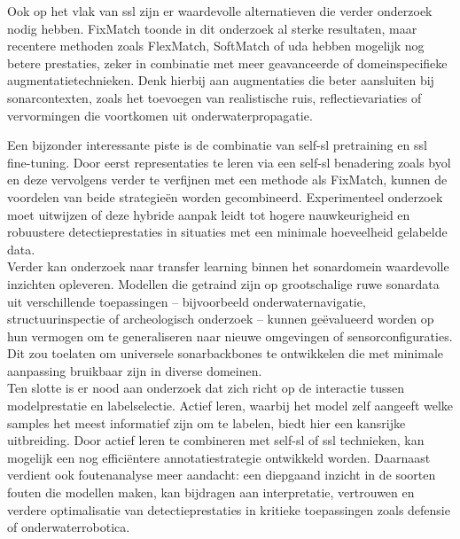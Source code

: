 Ook op het vlak van \gls{ssl} zijn er waardevolle alternatieven die verder onderzoek nodig hebben. FixMatch toonde in dit onderzoek al sterke resultaten, maar recentere methoden zoals FlexMatch, SoftMatch of \gls{uda} hebben mogelijk nog betere prestaties, zeker in combinatie met meer geavanceerde of domeinspecifieke augmentatietechnieken. Denk hierbij aan augmentaties die beter aansluiten bij sonarcontexten, zoals het toevoegen van realistische ruis, reflectievariaties of vervormingen die voortkomen uit onderwaterpropagatie.

Een bijzonder interessante piste is de combinatie van \gls{self-sl} pretraining en \gls{ssl} fine-tuning. Door eerst representaties te leren via een \gls{self-sl} benadering zoals \gls{byol} en deze vervolgens verder te verfijnen met een methode als FixMatch, kunnen de voordelen van beide strategieën worden gecombineerd. Experimenteel onderzoek moet uitwijzen of deze hybride aanpak leidt tot hogere nauwkeurigheid en robuustere detectieprestaties in situaties met een minimale hoeveelheid gelabelde data. \\

Verder kan onderzoek naar transfer learning binnen het sonardomein waardevolle inzichten opleveren. Modellen die getraind zijn op grootschalige ruwe sonardata uit verschillende toepassingen -- bijvoorbeeld onderwaternavigatie, structuurinspectie of archeologisch onderzoek -- kunnen geëvalueerd worden op hun vermogen om te generaliseren naar nieuwe omgevingen of sensorconfiguraties. Dit zou toelaten om universele sonarbackbones te ontwikkelen die met minimale aanpassing bruikbaar zijn in diverse domeinen. \\

Ten slotte is er nood aan onderzoek dat zich richt op de interactie tussen modelprestatie en labelselectie. Actief leren, waarbij het model zelf aangeeft welke samples het meest informatief zijn om te labelen, biedt hier een kansrijke uitbreiding. Door actief leren te combineren met \gls{self-sl} of \gls{ssl} technieken, kan mogelijk een nog efficiëntere annotatiestrategie ontwikkeld worden. Daarnaast verdient ook foutenanalyse meer aandacht: een diepgaand inzicht in de soorten fouten die modellen maken, kan bijdragen aan interpretatie, vertrouwen en verdere optimalisatie van detectieprestaties in kritieke toepassingen zoals defensie of onderwaterrobotica.